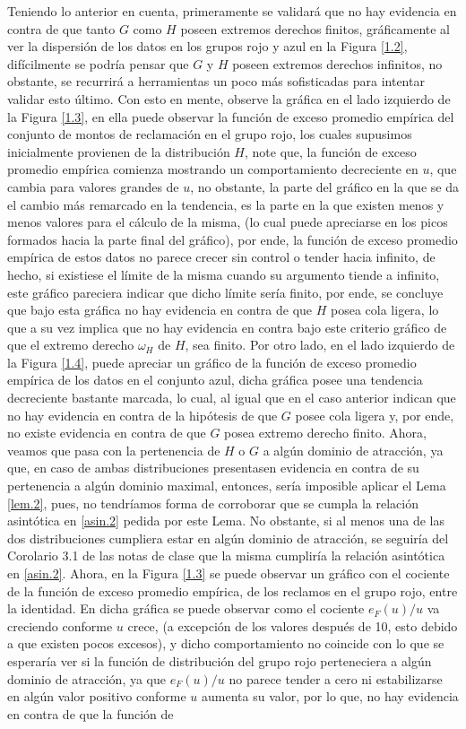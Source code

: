 \documentclass[10.5pt,notitlepage]{article}
\theoremstyle{plain}
\begin{document}
Teniendo lo anterior en cuenta, primeramente se validará que no hay evidencia en contra de que tanto \(G\) como \(H\) poseen extremos derechos finitos, gráficamente al ver la dispersión de los datos en los grupos rojo y azul en la Figura \ref{1.2}, difícilmente se podría pensar que \(G\) y \(H\) poseen extremos derechos infinitos, no obstante, se recurrirá a herramientas un poco más sofisticadas para intentar validar esto último. Con esto en mente, observe la gráfica en el lado izquierdo de la Figura \ref{1.3}, en ella puede observar la función de exceso promedio empírica del conjunto de montos de reclamación en el grupo rojo, los cuales supusimos inicialmente provienen de la distribución \(H\), note que, la función de exceso promedio empírica comienza mostrando un comportamiento decreciente en \(u\), que cambia para valores grandes de \(u\), no obstante, la parte del gráfico en la que se da el cambio más remarcado en la tendencia, es la parte en la que existen menos y menos valores para el cálculo de la misma, (lo cual puede apreciarse en los picos formados hacia la parte final del gráfico), por ende, la función de exceso promedio empírica de estos datos no parece crecer sin control o tender hacia infinito, de hecho, si existiese el límite de la misma cuando su argumento tiende a infinito, este gráfico pareciera indicar que dicho límite sería finito, por ende, se concluye que bajo esta gráfica no hay evidencia en contra de que \(H\) posea cola ligera, lo que a su vez implica que no hay evidencia en contra bajo este criterio gráfico de que el extremo derecho \(\omega_{H}\) de \(H\), sea finito. Por otro lado, en el lado izquierdo de la Figura \ref{1.4}, puede apreciar un gráfico de la función de exceso promedio empírica de los datos en el conjunto azul, dicha gráfica posee una tendencia decreciente bastante marcada, lo cual, al igual que en el caso anterior indican que no hay evidencia en contra de la hipótesis de que \(G\) posee cola ligera y, por ende, no existe evidencia en contra de que \(G\) posea extremo derecho finito. Ahora, veamos que pasa con la pertenencia de \(H\) o \(G\) a algún dominio de atracción, ya que, en caso de ambas distribuciones presentasen evidencia en contra de su pertenencia a algún dominio maximal, entonces, sería imposible aplicar el Lema \ref{lem.2}, pues, no tendríamos forma de corroborar que se cumpla la relación asintótica en \eqref{asin.2} pedida por este Lema. No obstante, si al menos una de las dos distribuciones cumpliera estar en algún dominio de atracción, se seguiría del Corolario 3.1 de las notas de clase  que la misma cumpliría la relación asintótica en \eqref{asin.2}. Ahora, en la Figura \ref{1.3} se puede observar un gráfico con el cociente de la función de exceso promedio empírica, de los reclamos en el grupo rojo, entre la identidad. En dicha gráfica se puede observar como el cociente $e_F(u)/u$ va creciendo conforme $u$ crece, (a excepción de los valores después de 10, esto debido a que existen pocos excesos), y dicho comportamiento no coincide con lo que se esperaría ver si la función de distribución del grupo rojo perteneciera a algún dominio de atracción, ya que $e_F(u)/u$ no parece tender a cero ni estabilizarse en algún valor positivo conforme $u$ aumenta su valor, por lo que, no hay evidencia en contra de que la función de 
\end{document}
